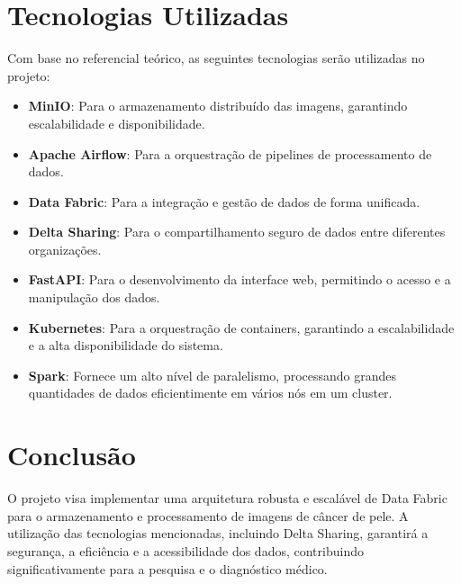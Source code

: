 \section{Tecnologias Utilizadas}

Com base no referencial teórico, as seguintes tecnologias serão utilizadas no projeto:
\begin{itemize}
    \item \textbf{MinIO}: Para o armazenamento distribuído das imagens, garantindo escalabilidade e disponibilidade.
    \item \textbf{Apache Airflow}: Para a orquestração de pipelines de processamento de dados.
    \item \textbf{Data Fabric}: Para a integração e gestão de dados de forma unificada.
    \item \textbf{Delta Sharing}: Para o compartilhamento seguro de dados entre diferentes organizações.
    \item \textbf{FastAPI}: Para o desenvolvimento da interface web, permitindo o acesso e a manipulação dos dados.
    \item \textbf{Kubernetes}: Para a orquestração de containers, garantindo a escalabilidade e a alta disponibilidade do sistema.
    \item \textbf{Spark}: Fornece um alto nível de paralelismo, processando grandes quantidades de dados eficientimente em vários nós em um cluster.
\end{itemize}

\section{Conclusão}

O projeto visa implementar uma arquitetura robusta e escalável de Data Fabric para o armazenamento e processamento de imagens de câncer de pele. A utilização das tecnologias mencionadas, incluindo Delta Sharing, garantirá a segurança, a eficiência e a acessibilidade dos dados, contribuindo significativamente para a pesquisa e o diagnóstico médico.